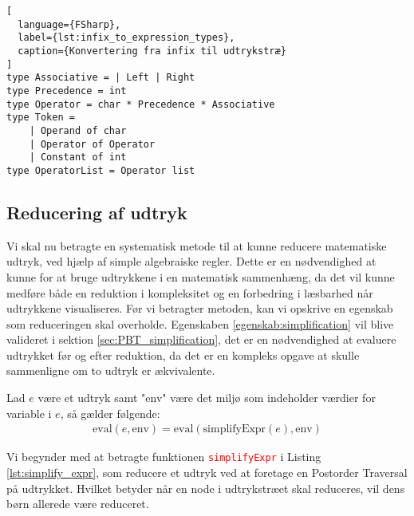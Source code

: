 \begin{lstlisting}[
  language={FSharp}, 
  label={lst:infix_to_expression_types}, 
  caption={Konvertering fra infix til udtrykstræ}
]
type Associative = | Left | Right
type Precedence = int
type Operator = char * Precedence * Associative
type Token =
    | Operand of char
    | Operator of Operator
    | Constant of int
type OperatorList = Operator list
\end{lstlisting}




\subsection{Reducering af udtryk} \label{sec:simplification_expression}
Vi skal nu betragte en systematisk metode til at kunne reducere matematiske udtryk, ved hjælp af simple algebraiske regler. Dette er en nødvendighed at kunne for at bruge udtrykkene i en matematisk sammenhæng, da det vil kunne medføre både en reduktion i kompleksitet og en forbedring i læsbarhed når udtrykkene visualiseres. Før vi betragter metoden, kan vi opskrive en egenskab som reduceringen skal overholde. Egenskaben \ref{egenskab:simplification} vil blive valideret i sektion \ref{sec:PBT_simplification}, det er en nødvendighed at evaluere udtrykket før og efter reduktion, da det er en kompleks opgave at skulle sammenligne om to udtryk er ækvivalente.
\vspace{0.5cm}
\begin{egenskab}\label{egenskab:simplification}
Lad $e$ være et udtryk samt "env" være det miljø som indeholder værdier for variable i $e$, så gælder følgende:
\begin{align*}
  \text{eval}(e, \text{env}) = \text{eval}(\text{simplifyExpr}(e), \text{env})
\end{align*}
\end{egenskab}  

Vi begynder med at betragte funktionen \textcolor{red}{\texttt{simplifyExpr}} i Listing \ref{lst:simplify_expr}, som reducere et udtryk ved at foretage en Postorder Traversal på udtrykket. Hvilket betyder når en node i udtrykstræet skal reduceres, vil dens børn allerede være reduceret. 

